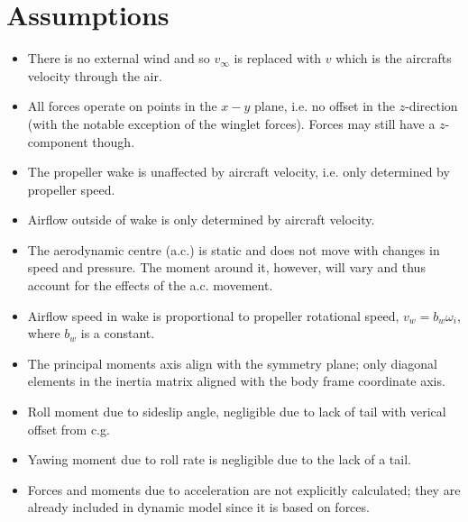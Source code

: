 \section{Assumptions}

\begin{itemize}
    \item There is no external wind and so $v_{\infty}$ is replaced with $v$ which is the aircrafts velocity through the air.

    \item All forces operate on points in the $x-y$ plane, i.e. no offset in the $z$-direction (with the notable exception of the winglet forces). Forces may still have a $z$-component though.

    \item The propeller wake is unaffected by aircraft velocity, i.e. only determined by propeller speed.

    \item Airflow outside of wake is only determined by aircraft velocity.

    \item The aerodynamic centre (a.c.) is static and does not move with changes in speed and pressure. The moment around it, however, will vary and thus account for the effects of the a.c. movement.

    \item Airflow speed in wake is proportional to propeller rotational speed, $v_w = b_w \omega_i$, where $b_w$ is a constant.

    \item The principal moments axis align with the symmetry plane; only diagonal elements in the inertia matrix aligned with the body frame coordinate axis.

    \item Roll moment due to sideslip angle, negligible due to lack of tail with verical offset from c.g.

    \item Yawing moment due to roll rate is negligible due to the lack of a tail.

    \item Forces and moments due to acceleration are not explicitly calculated; they are already included in  dynamic model since it is based on forces.

\end{itemize}
